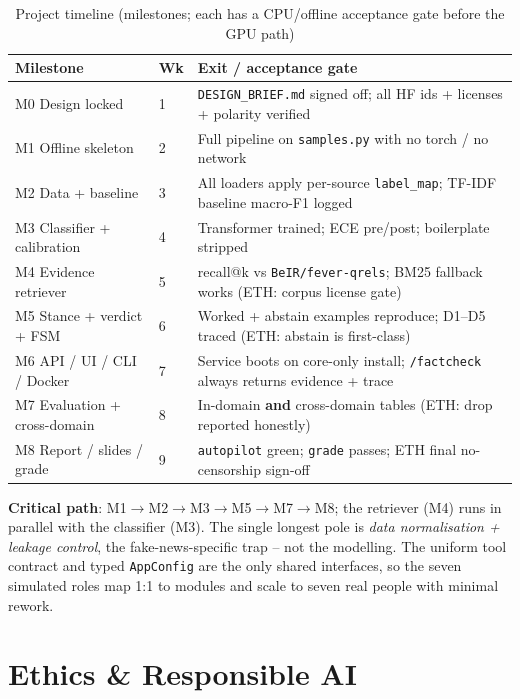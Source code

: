 \documentclass[12pt,a4paper]{article}
\begin{document}
\begin{table}[H]
\centering
\caption{Project timeline (milestones; each has a CPU/offline acceptance gate before the GPU path)}
\small
\begin{tabularx}{\linewidth}{@{} l l L @{}}
\toprule
\textbf{Milestone} & \textbf{Wk} & \textbf{Exit / acceptance gate} \\
\midrule
M0 Design locked & 1 & \texttt{DESIGN\_BRIEF.md} signed off; all HF ids + licenses + polarity verified \\
M1 Offline skeleton & 2 & Full pipeline on \texttt{samples.py} with no torch / no network \\
M2 Data + baseline & 3 & All loaders apply per-source \texttt{label\_map}; TF-IDF baseline macro-F1 logged \\
M3 Classifier + calibration & 4 & Transformer trained; ECE pre/post; boilerplate stripped \\
M4 Evidence retriever & 5 & recall@k vs \texttt{BeIR/fever-qrels}; BM25 fallback works (ETH: corpus license gate) \\
M5 Stance + verdict + FSM & 6 & Worked + abstain examples reproduce; D1--D5 traced (ETH: abstain is first-class) \\
M6 API / UI / CLI / Docker & 7 & Service boots on core-only install; \texttt{/factcheck} always returns evidence + trace \\
M7 Evaluation + cross-domain & 8 & In-domain \textbf{and} cross-domain tables (ETH: drop reported honestly) \\
M8 Report / slides / grade & 9 & \texttt{autopilot} green; \texttt{grade} passes; ETH final no-censorship sign-off \\
\bottomrule
\end{tabularx}
\end{table}

\textbf{Critical path}: M1$\rightarrow$M2$\rightarrow$M3$\rightarrow$M5$\rightarrow$M7$\rightarrow$M8; the retriever (M4) runs in parallel with the classifier (M3). The single longest pole is \emph{data normalisation + leakage control}, the fake-news-specific trap -- not the modelling. The uniform tool contract and typed \texttt{AppConfig} are the only shared interfaces, so the seven simulated roles map 1:1 to modules and scale to seven real people with minimal rework.

\section{Ethics \& Responsible AI}
\end{document}
